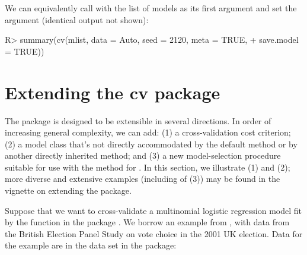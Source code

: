 \documentclass[
]{jss}
\begin{document}
We can equivalently call  with the list of models as its
first argument and set the argument  (identical output
not shown):

\begin{CodeChunk}
\begin{CodeInput}
R> summary(cv(mlist, data = Auto, seed = 2120, meta = TRUE,
+            save.model = TRUE))
\end{CodeInput}
\end{CodeChunk}

\section{Extending the cv package}\label{extending-the-cv-package}

The  package is designed to be extensible in several directions.
In order of increasing general complexity, we can add: (1) a
cross-validation cost criterion; (2) a model class that's not directly
accommodated by the  default method or by another directly
inherited method; and (3) a new model-selection procedure suitable for
use with the  method for . In this section,
we illustrate (1) and (2); more diverse and extensive examples
(including of (3)) may be found in the vignette on extending the
 package.

Suppose that we want to cross-validate a multinomial logistic regression
model fit by the  function in the  package
\citep{VenablesRipley:2002}. We borrow an example from \citet[Sec.~14.2.1]{Fox:2016},
with data from the British Election Panel Study on
vote choice in the 2001 UK election. Data for the example are in the
 data set in the  package:
\end{document}
